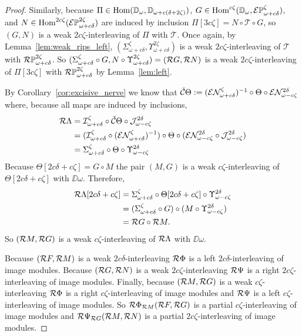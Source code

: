 \begin{proof}
  Similarly, because $\Pi\in\mathrm{Hom}(\mathbb{D}_{\omega},\mathbb{D}_{\omega+c(\delta+2\zeta)})$, $G\in\mathrm{Hom}^{c\zeta}(\mathbb{D}_{\omega}, \mathcal{E} \mathbb{P}_{\omega+c\delta}^{\zeta})$, and $N\in\mathrm{Hom}^{2c\zeta}(\mathcal{E} \mathbb{P}_{\omega+c\delta}^{2\zeta})$ are induced by inclusion $\Pi[3c\zeta] = N\circ \mathcal{T}\circ G$, so $(G, N)$ is a weak $2c\zeta$-interleaving of $\Pi$ with $\mathcal{T}$.
  Once again, by Lemma~\ref{lem:weak_rips_left}, $(\Sigma_{\omega+c\delta}^{\zeta},\Upsilon_{\omega+c\delta}^{2\zeta})$ is a weak $2c\zeta$-interleaving of $\mathcal{T}$ with $\mathcal{R}\mathbb{P}_{\omega+c\delta}^{2\zeta}$.
  So $(\Sigma_{\omega+c\delta}^{\zeta}\circ G, N\circ \Upsilon_{\omega+c\delta}^{2\zeta}) = (\mathcal{R} G, \mathcal{R} N)$ is a weak $2c\zeta$-interleaving of $\Pi[3c\zeta]$ with $\mathcal{R}\mathbb{P}_{\omega+c\delta}^{2\zeta}$ by Lemma~\ref{lem:left}.

  By Corollary~\ref{cor:excisive_nerve} we know that $\check{\mathcal{C}}\Theta := (\mathcal{E}\mathcal{N}_{\omega+c\delta}^\zeta)^{-1}\circ \Theta\circ \mathcal{E}\mathcal{N}_{\omega-c\zeta}^{2\delta}$
  where, because all maps are induced by inclusions,
  \begin{align*}
    \mathcal{R}\Lambda &= \mathcal{I}_{\omega+c\delta}^\zeta\circ\check{\mathcal{C}}\Theta\circ\mathcal{J}_{\omega-c\zeta}^{2\delta}\\
      &= (\mathcal{I}_{\omega+c\delta}^\zeta\circ (\mathcal{E}\mathcal{N}_{\omega+c\delta}^\zeta)^{-1})\circ \Theta\circ (\mathcal{E}\mathcal{N}_{\omega-c\zeta}^{2\delta}\circ \mathcal{J}_{\omega-c\zeta}^{2\delta})\\
      &= \Sigma_{\omega+c\delta}^\zeta\circ \Theta\circ \Upsilon_{\omega-c\zeta}^{2\delta}\\
  \end{align*}
  Because $\Theta[2c\delta+c\zeta] = G\circ M$ the pair $(M, G)$ is a weak $c\zeta$-interleaving of $\Theta[2c\delta+c\zeta]$ with $\DD{\omega}$.
  Therefore,
  \begin{align*}
    \mathcal{R}\Lambda[2c\delta+c\zeta] &= \Sigma_{\omega+c\delta}^\zeta\circ \Theta[2c\delta+c\zeta]\circ \Upsilon_{\omega-c\zeta}^{2\delta}\\
      &= (\Sigma_{\omega+c\delta}^\zeta\circ G)\circ (M\circ \Upsilon_{\omega-c\zeta}^{2\delta})\\
      &= \mathcal{R} G\circ \mathcal{R} M.
  \end{align*}
  So $(\mathcal{R} M, \mathcal{R} G)$ is a weak $c\zeta$-interleaving of $\mathcal{R}\Lambda$ with $\DD{\omega}$.

  Because $(\mathcal{R} F,\mathcal{R} M)$ is a weak $2c\delta$-interleaving $\mathcal{R} \Phi$ is a left $2c\delta$-interleaving of image modules.
  Because $(\mathcal{R} G, \mathcal{R} N)$ is a weak $2c\zeta$-interleaving $\mathcal{R} \Psi$ is a right $2c\zeta$-interleaving of image modules.
  Finally, because $(\mathcal{R} M, \mathcal{R} G)$ is a weak $c\zeta$-interleaving $\mathcal{R} \Phi$ is a right $c\zeta$-interleaving of image modules and $\mathcal{R} \Psi$ is a left $c\zeta$-interleaving of image modules.
  So $\mathcal{R} \Phi_{\mathcal{R} M}(\mathcal{R} F, \mathcal{R} G)$ is a partial $c\zeta$-interleaving of image modules and $\mathcal{R} \Psi_{\mathcal{R} G} (\mathcal{R} M,\mathcal{R} N)$ is a partial $2c\zeta$-interleaving of image modules.


\end{proof}
